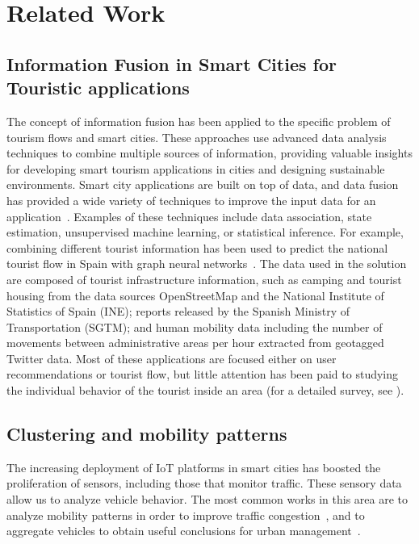 \chapter{Related Work} \label{ch:related_work}

\section{Information Fusion in Smart Cities for Touristic applications}

The concept of information fusion has been applied to the specific problem of tourism flows and smart cities. These approaches use advanced data analysis techniques to combine multiple sources of information, providing valuable insights for developing smart tourism applications in cities and designing sustainable environments. Smart city applications are built on top of data, and data fusion has provided a wide variety of techniques to improve the input data for an application~\cite{lau2019survey}. Examples of these techniques include data association, state estimation, unsupervised machine learning, or statistical inference. For example, combining different tourist information has been used to predict the national tourist flow in Spain with graph neural networks~\cite{saenz2023nation}. The data used in the solution are composed of tourist infrastructure information, such as camping and tourist housing from the data sources OpenStreetMap and the National Institute of Statistics of Spain (INE); reports released by the Spanish Ministry of Transportation (SGTM); and human mobility data including the number of movements between administrative areas per hour extracted from geotagged Twitter data. Most of these applications are focused either on user recommendations or tourist flow, but little attention has been paid to studying the individual behavior of the tourist inside an area (for a detailed survey, see \cite{doborjeh2022artificial, lau2019survey}). 

\section{Clustering and mobility patterns}

The increasing deployment of IoT platforms in smart cities has boosted the proliferation of sensors, including those that monitor traffic. These sensory data allow us to analyze vehicle behavior. The most common works in this area are to analyze mobility patterns in order to improve traffic congestion~\cite{mondal2019identifying,peixoto2021traffic}, and to aggregate vehicles to obtain useful conclusions for urban management~\cite{bolanos2022clustering, lin2019application}. 

